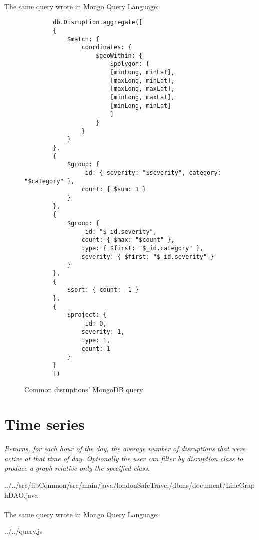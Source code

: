 \paragraph{}
The same query wrote in Mongo Query Language:
\begin{figure}[H]
	\begin{lstlisting}
		db.Disruption.aggregate([
		{
			$match: {
				coordinates: {
					$geoWithin: {
						$polygon: [
						[minLong, minLat],
						[maxLong, minLat],
						[maxLong, maxLat],
						[minLong, maxLat],
						[minLong, minLat]
						]
					}
				}
			}
		},
		{
			$group: {
				_id: { severity: "$severity", category: "$category" },
				count: { $sum: 1 }
			}
		},
		{
			$group: {
				_id: "$_id.severity",
				count: { $max: "$count" },
				type: { $first: "$_id.category" },
				severity: { $first: "$_id.severity" }
			}
		},
		{
			$sort: { count: -1 }
		},
		{
			$project: {
				_id: 0,
				severity: 1,
				type: 1,
				count: 1
			}
		}
		])
	\end{lstlisting}
	\caption{Common disruptions' MongoDB query}
\end{figure}

\section{Time series}
\textit{Returns, for each hour of the day, the average number of disruptions that were active at that time of day. Optionally the user can filter by disruption class to produce a graph relative only the specified class.}


{../../src/libCommon/src/main/java/londonSafeTravel/dbms/document/LineGraphDAO.java}

\paragraph{}
The same query wrote in Mongo Query Language:

{../../query.js}
